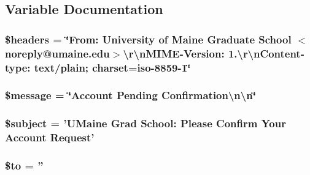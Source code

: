 \subsection{Variable Documentation}
\hypertarget{account_confirmation_8email_8php_a52500036ee807241b8b4b7e2367c49ef}{
\subsubsection[{\$headers}]{\setlength{\rightskip}{0pt plus 5cm}\$headers = \char`\"{}From\-: University of Maine Graduate School $<$noreply@umaine.\-edu$>$\textbackslash{}r\textbackslash{}n\-M\-I\-M\-E-\/Version\-: 1.\textbackslash{}r\textbackslash{}n\-Content-\/type\-: text/plain; charset=iso-\/8859-\/1\char`\"{}}}\label{account_confirmation_8email_8php_a52500036ee807241b8b4b7e2367c49ef}
\hypertarget{account_confirmation_8email_8php_abf17cb2dba2ed17cb28aa5f37deb5293}{
\subsubsection[{\$message}]{\setlength{\rightskip}{0pt plus 5cm}\$message = \char`\"{}Account Pending Confirmation\textbackslash{}n\textbackslash{}n\char`\"{}}}\label{account_confirmation_8email_8php_abf17cb2dba2ed17cb28aa5f37deb5293}
\hypertarget{account_confirmation_8email_8php_afea90503726cd5ad2eb80baf0b6d217d}{
\subsubsection[{\$subject}]{\setlength{\rightskip}{0pt plus 5cm}\$subject = 'U\-Maine Grad School\-: Please Confirm Your Account Request'}}\label{account_confirmation_8email_8php_afea90503726cd5ad2eb80baf0b6d217d}
\hypertarget{account_confirmation_8email_8php_ac19f839b525d6d99d063fe56bf2a6d3b}{
\subsubsection[{\$to}]{\setlength{\rightskip}{0pt plus 5cm}\$to = ''}}\label{account_confirmation_8email_8php_ac19f839b525d6d99d063fe56bf2a6d3b}
